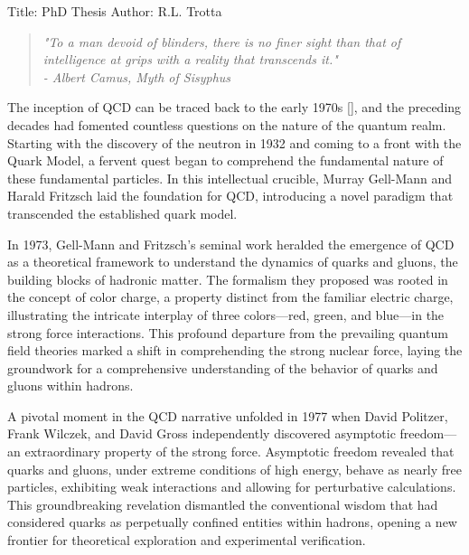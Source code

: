 \documentclass[
]{report}
\author{}
\date{}
\begin{document}
Title: PhD Thesis Author: R.L. Trotta

\label{Chapter-1}

\begin{quote}
\centering \emph{"To a man devoid of blinders, there is no finer sight than that of intelligence at grips with a reality that transcends it."}\\
\centering \emph{- Albert Camus, Myth of Sisyphus}
\end{quote}

\hfill

The inception of QCD can be traced back to the early 1970s
{[}\cite{gross_50_2023}{]}, and the preceding decades had fomented
countless questions on the nature of the quantum realm. Starting with
the discovery of the neutron in 1932 and coming to a front with the
Quark Model, a fervent quest began to comprehend the fundamental nature
of these fundamental particles. In this intellectual crucible, Murray
Gell-Mann and Harald Fritzsch laid the foundation for QCD, introducing a
novel paradigm that transcended the established quark model.

In 1973, Gell-Mann and Fritzsch's seminal work heralded the emergence of
QCD as a theoretical framework to understand the dynamics of quarks and
gluons, the building blocks of hadronic matter. The formalism they
proposed was rooted in the concept of color charge, a property distinct
from the familiar electric charge, illustrating the intricate interplay
of three colors---red, green, and blue---in the strong force
interactions. This profound departure from the prevailing quantum field
theories marked a shift in comprehending the strong nuclear force,
laying the groundwork for a comprehensive understanding of the behavior
of quarks and gluons within hadrons.

A pivotal moment in the QCD narrative unfolded in 1977 when David
Politzer, Frank Wilczek, and David Gross independently discovered
asymptotic freedom---an extraordinary property of the strong force.
Asymptotic freedom revealed that quarks and gluons, under extreme
conditions of high energy, behave as nearly free particles, exhibiting
weak interactions and allowing for perturbative calculations. This
groundbreaking revelation dismantled the conventional wisdom that had
considered quarks as perpetually confined entities within hadrons,
opening a new frontier for theoretical exploration and experimental
verification.

\label{Chapter-1-1}
\end{document}
